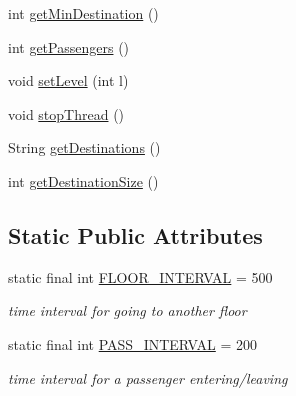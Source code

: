 \begin{DoxyCompactItemize}
\item 
int \hyperlink{classcn_1_1leonwong_1_1_elevator_simulator_1_1_model_1_1_elevator_a9aeca7de346d6a46aea0692a60e57681}{get\+Min\+Destination} ()
\item 
int \hyperlink{classcn_1_1leonwong_1_1_elevator_simulator_1_1_model_1_1_elevator_acd5f3b902008c64175d9b5c035e8d77f}{get\+Passengers} ()
\item 
void \hyperlink{classcn_1_1leonwong_1_1_elevator_simulator_1_1_model_1_1_elevator_aadee7a0c9b8e13427d46a9f907dcee94}{set\+Level} (int l)
\item 
void \hyperlink{classcn_1_1leonwong_1_1_elevator_simulator_1_1_model_1_1_elevator_a838e6a91c1e6d1ed2786efc462c48151}{stop\+Thread} ()
\item 
String \hyperlink{classcn_1_1leonwong_1_1_elevator_simulator_1_1_model_1_1_elevator_aca1fa93441f3463aece03f01591efa61}{get\+Destinations} ()
\item 
int \hyperlink{classcn_1_1leonwong_1_1_elevator_simulator_1_1_model_1_1_elevator_a8e71679aa5ed47ac62be7d4193f81055}{get\+Destination\+Size} ()
\end{DoxyCompactItemize}
\subsection*{Static Public Attributes}
\begin{DoxyCompactItemize}
\item 
\mbox{\label{classcn_1_1leonwong_1_1_elevator_simulator_1_1_model_1_1_elevator_af9cc2a12533172485e7539f3690b2af9}} 
static final int \hyperlink{classcn_1_1leonwong_1_1_elevator_simulator_1_1_model_1_1_elevator_af9cc2a12533172485e7539f3690b2af9}{F\+L\+O\+O\+R\+\_\+\+I\+N\+T\+E\+R\+V\+AL} = 500
\begin{DoxyCompactList}\small\item\em time interval for going to another floor \end{DoxyCompactList}\item 
\mbox{\label{classcn_1_1leonwong_1_1_elevator_simulator_1_1_model_1_1_elevator_ac80145be36386f30ed5b40518706fdc6}} 
static final int \hyperlink{classcn_1_1leonwong_1_1_elevator_simulator_1_1_model_1_1_elevator_ac80145be36386f30ed5b40518706fdc6}{P\+A\+S\+S\+\_\+\+I\+N\+T\+E\+R\+V\+AL} = 200
\begin{DoxyCompactList}\small\item\em time interval for a passenger entering/leaving \end{DoxyCompactList}\end{DoxyCompactItemize}


